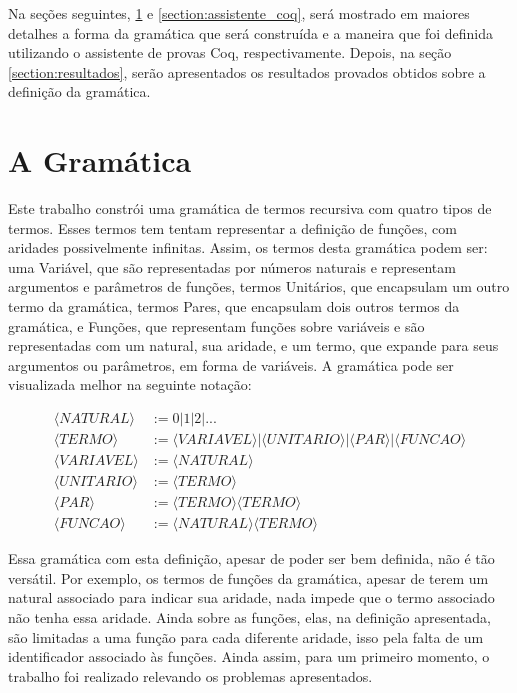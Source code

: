 \documentclass{article}
\begin{document}
Na seções seguintes, \ref{section:a_gramatica} e \ref{section:assistente_coq}, será mostrado em maiores
detalhes a forma da gramática que será construída e a maneira que foi definida utilizando o assistente de provas Coq, respectivamente. Depois, na seção \ref{section:resultados}, serão apresentados os
resultados provados obtidos sobre a definição da gramática.

\section{A Gramática}
\label{section:a_gramatica}

Este trabalho constrói uma gramática de termos recursiva com quatro tipos de termos. Esses termos tem  tentam representar a definição de funções, com aridades possivelmente infinitas. Assim, os termos desta
gramática podem ser: uma Variável, que são representadas por números naturais e representam argumentos
e parâmetros de funções, termos Unitários, que encapsulam um outro termo da gramática, termos Pares,
que encapsulam dois outros termos da gramática, e Funções, que representam funções sobre variáveis e
são representadas com um natural, sua aridade, e um termo, que expande para seus argumentos ou
parâmetros, em forma de variáveis. A gramática pode ser visualizada melhor na seguinte notação:


\begin{equation}
	\begin{split}
		\langle NATURAL \rangle  & := 0 | 1 | 2 | ... \\
		\langle TERMO \rangle    & :=
			\langle VARIAVEL \rangle |
			\langle UNITARIO \rangle |
			\langle PAR \rangle |
			\langle FUNCAO \rangle \\
		\langle VARIAVEL \rangle & := \langle NATURAL \rangle \\
		\langle UNITARIO \rangle & := \langle TERMO \rangle \\
		\langle PAR \rangle      & := \langle TERMO \rangle \langle TERMO \rangle \\
		\langle FUNCAO \rangle   & := \langle NATURAL \rangle \langle TERMO \rangle
	\end{split}
\end{equation}

Essa gramática com esta definição, apesar de poder ser bem definida, não é tão versátil. Por exemplo,
os termos de funções da gramática, apesar de terem um natural associado para indicar sua aridade, nada
impede que o termo associado não tenha essa aridade. Ainda sobre as funções, elas, na definição
apresentada, são limitadas a uma função para cada diferente aridade, isso pela falta de um
identificador associado às funções. Ainda assim, para um primeiro momento, o trabalho foi realizado
relevando os problemas apresentados.
\end{document}
